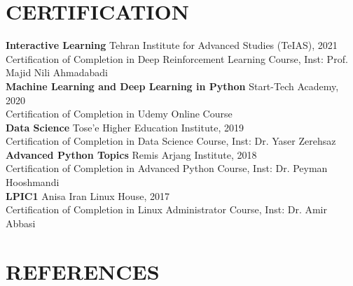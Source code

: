 \documentclass[11pt]{article}
\begin{document}
\section{CERTIFICATION}  

\textbf{Interactive Learning}  \hfill Tehran Institute for Advanced Studies (TeIAS), 2021\\
Certification of Completion in Deep Reinforcement Learning Course, Inst: Prof. Majid Nili Ahmadabadi	\href{https://scholar.google.com/citations?user=QlwWxmoAAAAJ&hl=en}{\small \faExternalLink}\\
\textbf{Machine Learning and Deep Learning in Python}  \hfill Start-Tech Academy, 2020\\
Certification of Completion in Udemy Online Course\\
\textbf{Data Science} \hfill Tose’e Higher Education Institute, 2019\\
Certification of Completion in Data Science Course, Inst: Dr. Yaser Zerehsaz \href{https://scholar.google.com/citations?user=QlwWxmoAAAAJ&hl=en}{\small \faExternalLink}\\
\textbf{Advanced Python Topics} \hfill Remis Arjang Institute, 2018\\
Certification of Completion in Advanced Python Course, Inst: Dr. Peyman Hooshmandi\\
\textbf{LPIC1} \hfill Anisa Iran Linux House, 2017\\
Certification of Completion in Linux Administrator Course, Inst: Dr. Amir Abbasi

\section{REFERENCES}
\end{document}
